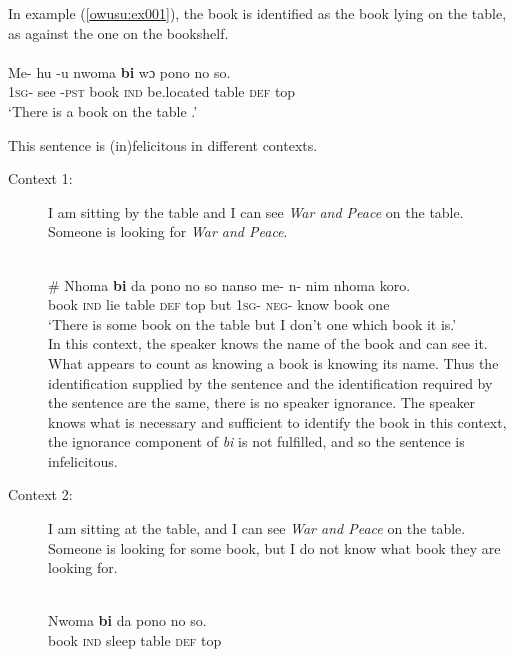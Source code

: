 \documentclass[output=paper,modfonts,nonflat,draftmode]{langsci/langscibook}
\begin{document}
In example (\ref{owusu:ex001}), the book is identified as the book lying on the table, as against the one on the bookshelf.  \\
\ea\label{owusu:ex001}\\
\gll Me- hu -u nwoma \textbf{bi} wɔ pono no so.\\
	     \textsc{1sg}- see -\textsc{pst}  book \textsc{ind} be.located table \textsc{def}  top\\
\glt `There is a book on the table .'
 \z 
 
This sentence is (in)felicitous in different contexts.

\begin{description}
\item[Context 1:] I am sitting by the table and I can see \emph{\emph{War and Peace}} on the table. Someone is looking for \emph{\emph{War and Peace}}.

\ea\label{owusu:ex00}\\
\gll \# Nhoma \textbf{bi} da pono no so nanso me- n- nim nhoma koro.\\
	     {} book \textsc{ind}  lie table \textsc{def}  top but \textsc{1sg}- \textsc{neg}- know book one\\

\glt `There is some book on the table but I don't one which book it is.'\\

 \z  In this context, the speaker knows the name of the book and can see it. What appears to count as knowing a book is knowing its name. Thus the identification supplied by the sentence and the identification required by the sentence are the same, there is no speaker ignorance. The speaker knows what is necessary and sufficient to identify the book in this context, the ignorance component of \emph{bi} is not fulfilled, and so the sentence is infelicitous.

\item[Context 2:] I am sitting at the table, and I can see \emph{\emph{War and Peace}} on the table. Someone is looking for some book, but I do not know what book they are looking for.  

\ea\label{owusu:ex62}\\
\gll Nwoma \textbf{bi} da pono no so.\\
	      book \textsc{ind}  sleep table \textsc{def} top\\


\end{description}
\end{document}
